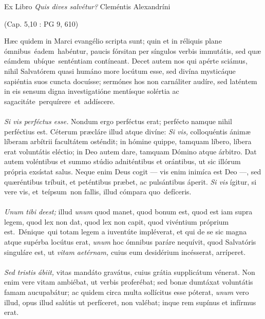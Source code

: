 \documentclass[options]{article}
\begin{document}
		Ex Libro 
		\textit{Quis dives salvétur?}
		Cleméntis Alexandríni 
		\begin{flushright}
					(Cap. 5,10 : PG 9, 610)
		\end{flushright}
	Hæc quidem in Marci evangélio scripta sunt; quin et in réliquis plane ómnibus éadem habéntur, paucis fórsitan per síngulos verbis immutátis, sed quæ eámdem ubíque senténtiam contíneant. Decet autem nos qui apérte sciámus, nihil Salvatórem quasi humáno more locútum esse, sed divína mysticáque sapiéntia suos cuncta docuísse; sermónes hos non carnáliter audíre, sed laténtem in eis sensum digna investigatióne mentísque solértia ac sagacitáte perquírere et addíscere.\\
	\\
\emph{Si vis perféctus esse.}
	Nondum ergo perféctus erat; perfécto namque nihil perféctius est. Céterum præcláre illud atque divíne: 
	\emph{Si vis,}
	colloquéntis ánimæ líberam arbítrii facultátem osténdit; in hómine quippe, tamquam líbero, líbera erat voluntátis eléctio; in Deo autem dare, tamquam Dómino atque árbitro. Dat autem voléntibus et summo stúdio adniténtibus et orántibus, ut sic illórum própria exsístat salus. Neque enim Deus cogit — vis enim inimíca est Deo —, sed quæréntibus tríbuit, et peténtibus præbet, ac pulsántibus áperit. 
	\emph{Si vis}
	ígitur, si vere vis, et teípsum non fallis, illud cómpara quo defíceris.\\
	\\
	\emph{Unum tibi deest;}
	 illud 
	 \emph{unum}
	 quod manet, quod bonum est, quod est iam supra legem, quod lex non dat, quod lex non capit, quod vivéntium próprium est. Dénique qui totam legem a iuventúte impléverat, et qui de se sic magna atque supérba locútus erat,
	  \emph{unum}
	 hoc ómnibus paráre nequívit, quod Salvatóris singuláre est, ut 
	 \emph{vitam aetérnam,}
	  cuius eum desidérium incésserat, arríperet.\\
	  \\
	    \emph{Sed tristis ábiit,}
	    vitas mandáto gravátus, cuius grátia supplicátum vénerat. Non enim vere vitam ambiébat, ut verbis proferébat; sed bonæ dumtáxat voluntátis famam aucupabátur; ac quidem circa multa sollícitus esse póterat, 
	 \emph{unum}
	vero illud, opus illud salútis ut perfíceret, non valébat; inque rem supínus et infírmus erat.
\end{document}
